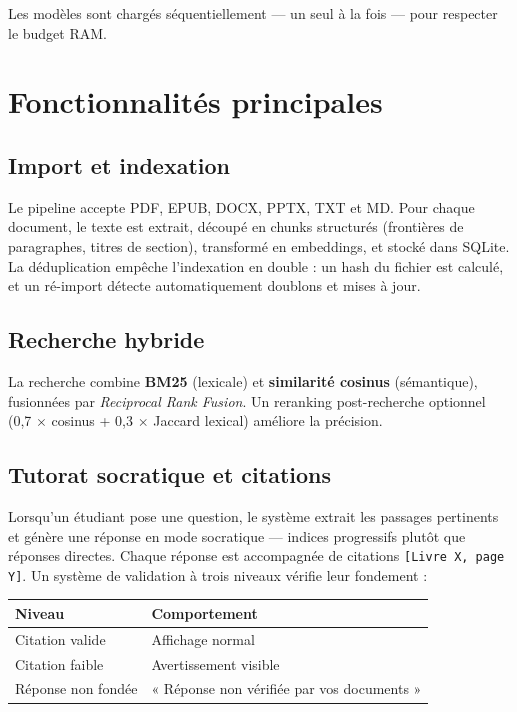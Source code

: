 \documentclass[11pt,a4paper]{article}
\begin{document}
Les modèles sont chargés séquentiellement --- un seul à la fois --- pour respecter le budget RAM.

\section{Fonctionnalités principales}

\subsection{Import et indexation}

Le pipeline accepte PDF, EPUB, DOCX, PPTX, TXT et MD. Pour chaque document, le texte est extrait, découpé en chunks structurés (frontières de paragraphes, titres de section), transformé en embeddings, et stocké dans SQLite. La déduplication empêche l'indexation en double : un hash du fichier est calculé, et un ré-import détecte automatiquement doublons et mises à jour.

\subsection{Recherche hybride}

La recherche combine \textbf{BM25} (lexicale) et \textbf{similarité cosinus} (sémantique), fusionnées par \textit{Reciprocal Rank Fusion}. Un reranking post-recherche optionnel (0,7 $\times$ cosinus + 0,3 $\times$ Jaccard lexical) améliore la précision.

\subsection{Tutorat socratique et citations}

Lorsqu'un étudiant pose une question, le système extrait les passages pertinents et génère une réponse en mode socratique --- indices progressifs plutôt que réponses directes. Chaque réponse est accompagnée de citations \texttt{[Livre X, page Y]}. Un système de validation à trois niveaux vérifie leur fondement :

\begin{center}
\begin{tabularx}{0.9\textwidth}{l X}
\toprule
\textbf{Niveau} & \textbf{Comportement} \\
\midrule
Citation valide & Affichage normal \\
Citation faible & Avertissement visible \\
Réponse non fondée & « Réponse non vérifiée par vos documents » \\
\bottomrule
\end{tabularx}
\end{center}
\end{document}
